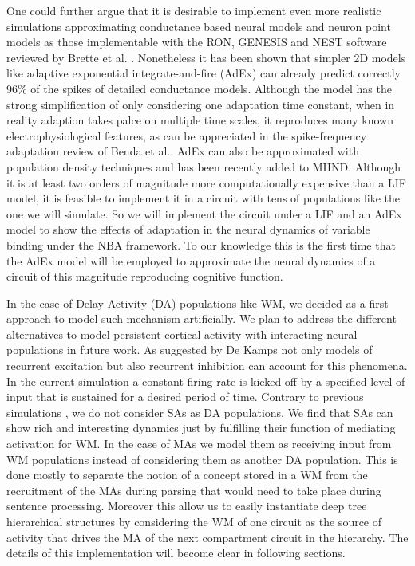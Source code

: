 \documentclass[10pt]{article}
\begin{document}
One could further argue that it is desirable to implement even more
realistic simulations approximating conductance based neural models
and neuron point models as those implementable with the RON, GENESIS
and NEST software reviewed by Brette et al.
\cite{brette2007simulation}. Nonetheless it has been shown that
simpler 2D models like adaptive exponential integrate-and-fire (AdEx)
can already predict correctly 96\% of the spikes of detailed
conductance models\cite{brette2005adaptive}. Although the model has
the strong simplification of only considering one adaptation time
constant, when in reality adaption takes palce on multiple time
scales, it reproduces many known electrophysiological features, as can
be appreciated in the spike-frequency adaptation review of Benda et
al.\cite{Benda_2003,Benda_2014}. AdEx can also be approximated with
population density techniques and has been recently added to MIIND.
Although it is at least two orders of magnitude more computationally
expensive than a LIF model, it is feasible to implement it in a
circuit with tens of populations like the one we will simulate. So we
will implement the circuit under a LIF and an AdEx model to show the
effects of adaptation in the neural dynamics of variable binding under
the NBA framework. To our knowledge this is the first time that the
AdEx model will be employed to approximate the neural dynamics of a
circuit of this magnitude reproducing cognitive function.

In the case of Delay Activity (DA) populations like WM, we decided as
a first approach to model such mechanism artificially. We plan to
address the different alternatives to model persistent cortical
activity with interacting neural populations in future work. As
suggested by De Kamps\cite{de_Kamps_2005} not only models of recurrent
excitation but also recurrent inhibition can account for this
phenomena. In the current simulation a constant firing rate is kicked
off by a specified level of input that is sustained for a desired
period of time. Contrary to previous simulations
\cite{velde2015ambiguity}, we do not consider SAs as DA populations.
We find that SAs can show rich and interesting dynamics just by
fulfilling their function of mediating activation for WM. In the case
of MAs we model them as receiving input from WM populations instead of
considering them as another DA population. This is done mostly to
separate the notion of a concept stored in a WM from the recruitment
of the MAs during parsing that would need to take place during
sentence processing. Moreover this allow us to easily instantiate deep
tree hierarchical structures by considering the WM of one circuit as
the source of activity that drives the MA of the next compartment
circuit in the hierarchy. The details of this implementation will
become clear in following sections.
\end{document}
